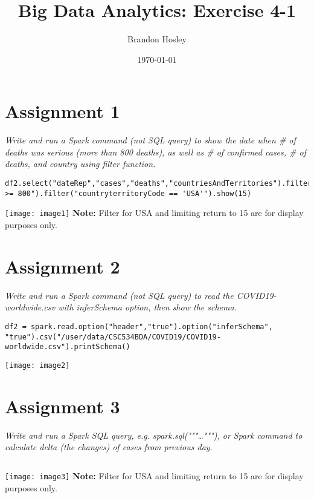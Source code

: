 \documentclass[]{article}
\title{Big Data Analytics: Exercise 4-1}
\author{Brandon Hosley}
\date{\today}
\begin{document}
\maketitle

\section*{Assignment 1}
\emph{ Write and run a Spark command (not SQL query) to show the date when # of deaths was serious (more than 800 deaths), as well as # of confirmed cases, # of deaths, and country using filter function. }

\begin{verbatim}
df2.select("dateRep","cases","deaths","countriesAndTerritories").filter("deaths >= 800").filter("countryterritoryCode == 'USA'").show(15)
\end{verbatim}
\texttt{[image: image1]} %
\textbf{Note:} Filter for USA and limiting return to 15 are for display purposes only.

\section*{Assignment 2}
\emph{ Write and run a Spark command (not SQL query) to read the COVID19-worldwide.csv with inferSchema option, then show the schema.
}

\begin{verbatim}
df2 = spark.read.option("header","true").option("inferSchema", "true").csv("/user/data/CSC534BDA/COVID19/COVID19-worldwide.csv").printSchema()
\end{verbatim}
\texttt{[image: image2]} %

\section*{Assignment 3}
\emph{ Write and run a Spark SQL query, e.g. spark.sql("""\ldots"""), or Spark command to calculate delta (the changes) of cases from previous day. }

\begin{verbatim}

\end{verbatim}
\texttt{[image: image3]} %
\textbf{Note:} Filter for USA and limiting return to 15 are for display purposes only.
\end{document}
